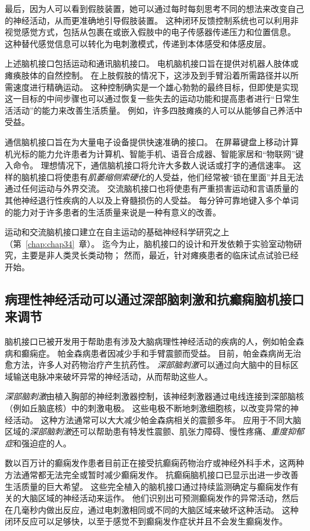 最后，因为人可以看到假肢装置，她可以通过每时每刻思考不同的想法来改变自己的神经活动，从而更准确地引导假肢装置。
这种闭环反馈控制系统也可以利用非视觉感觉方式，包括从包裹在或嵌入假肢中的电子传感器传递压力和位置信息。
这种替代感觉信息可以转化为电刺激模式，传递到本体感受和体感皮层。


上述脑机接口包括运动和通讯脑机接口。
电机脑机接口旨在提供对机器人肢体或瘫痪肢体的自然控制。
在上肢假肢的情况下，这涉及到手臂沿着所需路径并以所需速度进行精确运动。
这种控制确实是一个雄心勃勃的最终目标，但即使是实现这一目标的中间步骤也可以通过恢复一些失去的运动功能和提高患者进行“日常生活活动”的能力来改善生活质量。
例如，许多四肢瘫痪的人可以从能够自己养活中受益。


通信脑机接口旨在为大量电子设备提供快速准确的接口。 
在屏幕键盘上移动计算机光标的能力允许患者为计算机、智能手机、语音合成器、智能家居和“物联网”键入命令。 
理想情况下，通信脑机接口将允许大多数人说话或打字的通信速率。
这样的脑机接口将使患有\textit{肌萎缩侧索硬化}的人受益，他们经常被“锁在里面”并且无法通过任何运动与外界交流。
交流脑机接口也将使患有严重损害运动和言语质量的其他神经退行性疾病的人以及上脊髓损伤的人受益。
每分钟可靠地键入多个单词的能力对于许多患者的生活质量来说是一种有意义的改善。


运动和交流脑机接口建立在自主运动的基础神经科学研究之上（第~\ref{chap:chap34}~章）。 
迄今为止，脑机接口的设计和开发依赖于实验室动物研究，主要是非人类灵长类动物；
然而，最近，针对瘫痪患者的临床试点试验已经开始。



\subsection{病理性神经活动可以通过深部脑刺激和抗癫痫脑机接口来调节}

脑机接口已被开发用于帮助患有涉及大脑病理性神经活动的疾病的人，例如帕金森病和癫痫症。
帕金森病患者因减少手和手臂震颤而受益。 
目前，帕金森病尚无治愈方法，许多人对药物治疗产生抗药性。
\textit{深部脑刺激}可以通过向大脑中的目标区域输送电脉冲来破坏异常的神经活动，从而帮助这些人。


\textit{深部脑刺激}由植入胸部的神经刺激器控制，该神经刺激器通过电线连接到深部脑核（例如丘脑底核）中的刺激电极。 
这些电极不断地刺激细胞核，以改变异常的神经活动。 
这种方法通常可以大大减少帕金森病相关的震颤多年。 
应用于不同大脑区域的\textit{深部脑刺激}还可以帮助患有特发性震颤、肌张力障碍、慢性疼痛、\textit{重度抑郁症}和强迫症的人。


数以百万计的癫痫发作患者目前正在接受抗癫痫药物治疗或神经外科手术，这两种方法通常都无法完全或暂时减少癫痫发作。
抗癫痫脑机接口已显示出进一步改善生活质量的巨大希望。 
这些完全植入的脑机接口通过持续监测确定与癫痫发作有关的大脑区域的神经活动来运作。 
他们识别出可预测癫痫发作的异常活动，然后在几毫秒内做出反应，通过电刺激相同或不同的大脑区域来破坏这种活动。 
这种闭环反应可以足够快，以至于感觉不到癫痫发作症状并且不会发生癫痫发作。



